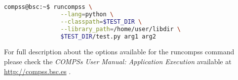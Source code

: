 \begin{lstlisting}[language=bash]
compss@bsc:~$ runcompss \
                --lang=python \
                --classpath=$TEST_DIR \
                --library_path=/home/user/libdir \
                $TEST_DIR/test.py arg1 arg2
\end{lstlisting}

For full description about the options available for the runcompss command please check the \textit{COMPSs User Manual: Application
Execution} available at \url{http://compss.bsc.es} . 
